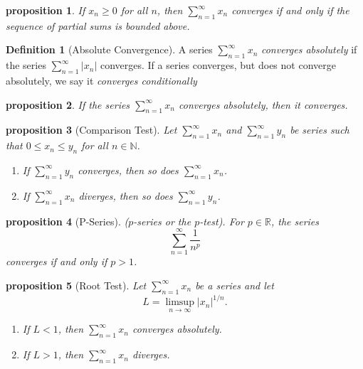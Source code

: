 \documentclass{article}
\newtheorem{proposition}{Proposition}[section]
\newtheorem{proposition}{proposition}[section]
\theoremstyle{definition}
\newtheorem{definition}{Definition}[section]
\theoremstyle{remark}
\begin{document}
\begin{proposition}
If $x_n \geq 0$ for all $n$, then $\sum_{n=1}^{\infty} x_n$ converges if and only if the sequence of partial sums is bounded above.
\end{proposition}





\begin{definition}[Absolute Convergence]\label{def:absolute_Convergence_series}
A series $\sum_{n=1}^{\infty} x_n$ \textit{converges absolutely} if the series $\sum_{n=1}^{\infty} |x_n|$ converges. If a series converges, but does not converge absolutely, we say it \textit{converges conditionally}
\end{definition}




\begin{proposition}
If the series $\sum_{n=1}^{\infty} x_n$ converges absolutely, then it converges.
\end{proposition}





\begin{proposition}[Comparison Test]\label{prp:comparison_test_series}
Let $\sum_{n=1}^{\infty} x_n$ and $\sum_{n=1}^{\infty} y_n$ be series such that $0 \leq x_n \leq y_n$ for all $n \in \mathbb{N}$.
\begin{enumerate}
\item If $\sum_{n=1}^{\infty} y_n$ converges, then so does $\sum_{n=1}^{\infty} x_n$.
\item If $\sum_{n=1}^{\infty} x_n$ diverges, then so does $\sum_{n=1}^{\infty} y_n$.
\end{enumerate}
\end{proposition}






\begin{proposition}[P-Series]\label{prp:p-series}
($p$-series or the $p$-test). For $p \in \mathbb{R}$, the series
\[
\sum_{n=1}^{\infty} \frac{1}{n^p}
\]
\textit{converges if and only if} $p > 1$.

\end{proposition}








\begin{proposition}[Root Test]\label{prp:root_test}
Let $\sum_{n=1}^{\infty} x_n$ be a series and let
\[
L = \limsup_{n \to \infty} |x_n|^{1/n}.
\]
\begin{enumerate}
\item If $L < 1$, then $\sum_{n=1}^{\infty} x_n$ \textit{converges absolutely}.
\item If $L > 1$, then $\sum_{n=1}^{\infty} x_n$ \textit{diverges}.
\end{enumerate}
\end{proposition}
\end{document}
